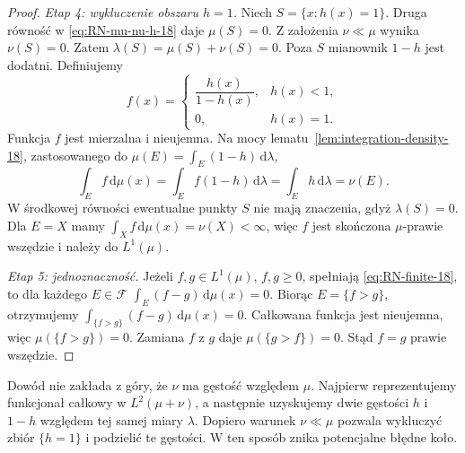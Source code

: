 \begin{proof}
\emph{Etap 4: wykluczenie obszaru $h=1$.}
Niech $S=\{x:h(x)=1\}$. Druga równość
w \eqref{eq:RN-mu-nu-h-18} daje $\mu(S)=0$.
Z założenia $\nu\ll\mu$ wynika $\nu(S)=0$.
Zatem $\lambda(S)=\mu(S)+\nu(S)=0$.
Poza $S$ mianownik $1-h$ jest dodatni.
Definiujemy
\[
f(x)=\begin{cases}
\dfrac{h(x)}{1-h(x)},&h(x)<1,\\[4pt]
0,&h(x)=1.
\end{cases}
\]
Funkcja $f$ jest mierzalna i nieujemna. Na mocy
lematu~\ref{lem:integration-density-18}, zastosowanego
do $\mu(E)=\int_E(1-h)\,\mathrm d\lambda$,
\[
\int_E f\,\mathrm d\mu(x)
 =\int_E f(1-h)\,\mathrm d\lambda
 =\int_Eh\,\mathrm d\lambda
 =\nu(E).
\]
W środkowej równości ewentualne punkty $S$ nie
mają znaczenia, gdyż $\lambda(S)=0$.
Dla $E=X$ mamy $\int_Xf\,\mathrm d\mu(x)=\nu(X)<\infty$,
więc $f$ jest skończona $\mu$-prawie wszędzie
i należy do $L^1(\mu)$.

\emph{Etap 5: jednoznaczność.}
Jeżeli $f,g\in L^1(\mu)$, $f,g\ge0$, spełniają
\eqref{eq:RN-finite-18}, to dla każdego $E\in\mathcal F$
$\int_E(f-g)\,\mathrm d\mu(x)=0$.
Biorąc $E=\{f>g\}$, otrzymujemy
$\int_{\{f>g\}}(f-g)\,\mathrm d\mu(x)=0$.
Całkowana funkcja jest nieujemna, więc
$\mu(\{f>g\})=0$. Zamiana $f$ z $g$ daje
$\mu(\{g>f\})=0$. Stąd $f=g$ prawie wszędzie.
\end{proof}

\begin{uwaga}[Rola pomocniczej miary $\lambda=\mu+\nu$]
Dowód nie zakłada z góry, że $\nu$ ma gęstość względem
$\mu$. Najpierw reprezentujemy funkcjonał całkowy w
$L^2(\mu+\nu)$, a następnie uzyskujemy dwie gęstości
$h$ i $1-h$ względem tej samej miary $\lambda$.
Dopiero warunek $\nu\ll\mu$ pozwala wykluczyć
zbiór $\{h=1\}$ i podzielić te gęstości.
W ten sposób znika potencjalne błędne koło.
\end{uwaga}

